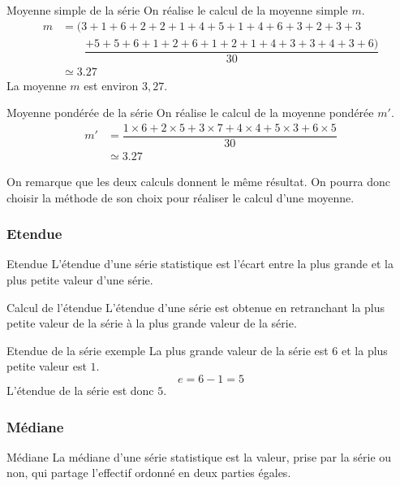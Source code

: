 \documentclass[titre=Stastistiques, classe=Troisième]{jeanmonnet}
\begin{document}
\begin{exemple}{Moyenne simple de la série}{}
	On réalise le calcul de la moyenne simple $m$.
	\begin{align*}
		m
		& = (3+1+6+2+2+1+4+5+1+4+6+3+2+3+3\\
		&\qquad\dfrac{+5+5+6+1+2+6+1+2+1+4+3+3+4+3+6)}{30}\\
		& \simeq 3.27
	\end{align*}
	La moyenne $m$ est environ $3,27$.
\end{exemple}

\begin{exemple}{Moyenne pondérée de la série}{}
	On réalise le calcul de la moyenne pondérée $m'$.
	\begin{align*}
		m' 
		& = \dfrac{1\times6 +2\times5 +3\times7 +4\times4 +5\times3 +6\times5 }{30}\\
		& \simeq 3.27
	\end{align*}
\end{exemple}

On remarque que les deux calculs donnent le même résultat. On pourra donc choisir la méthode de son choix pour réaliser le calcul d'une moyenne.

\subsubsection{Etendue}

\begin{definition}{Etendue}{}
	L'étendue d'une série statistique est l'écart entre la plus grande et la plus petite valeur d'une série.
\end{definition}

\begin{propriete}{Calcul de l'étendue}{}
	L'étendue d'une série est obtenue en retranchant la plus petite valeur de la série à la plus grande valeur de la série.
\end{propriete}

\begin{exemple}{Etendue de la série exemple}{}
	La plus grande valeur de la série est $6$ et la plus petite valeur est $1$.
	\[e = 6 - 1 = 5\]
	L'étendue de la série est donc $5$.
\end{exemple}

\subsubsection{Médiane}

\begin{definition}{Médiane}{}
	La médiane d'une série statistique est la valeur, prise par la série ou non, qui partage l'effectif ordonné en deux parties égales.
\end{definition}
\end{document}
